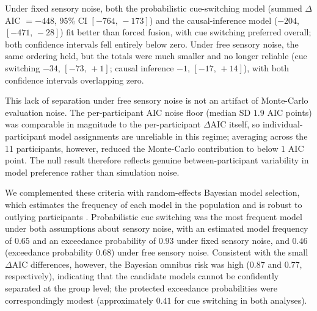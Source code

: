 \documentclass{jov}
\providecommand{\citep}[1]{\cite{#1}}
\begin{document}
Under fixed sensory noise, both the probabilistic cue-switching model (summed $\Delta$AIC $= -448$, 95\% CI $[-764,\,-173]$) and the causal-inference model ($-204$, $[-471,\,-28]$) fit better than forced fusion, with cue switching preferred overall; both confidence intervals fell entirely below zero. Under free sensory noise, the same ordering held, but the totals were much smaller and no longer reliable (cue switching $-34$, $[-73,\,+1]$; causal inference $-1$, $[-17,\,+14]$), with both confidence intervals overlapping zero.

This lack of separation under free sensory noise is not an artifact of Monte-Carlo evaluation noise. The per-participant AIC noise floor (median SD $1.9$ AIC points) was comparable in magnitude to the per-participant $\Delta$AIC itself, so individual-participant model assignments are unreliable in this regime; averaging across the 11 participants, however, reduced the Monte-Carlo contribution to below $1$ AIC point. The null result therefore reflects genuine between-participant variability in model preference rather than simulation noise.



We complemented these criteria with random-effects Bayesian model selection, which estimates the frequency of each model in the population and is robust to outlying participants \citep{stephan2009bayesian,rigoux2014bayesian}. Probabilistic cue switching was the most frequent model under both assumptions about sensory noise, with an estimated model frequency of $0.65$ and an exceedance probability of $0.93$ under fixed sensory noise, and $0.46$ (exceedance probability $0.68$) under free sensory noise. Consistent with the small $\Delta$AIC differences, however, the Bayesian omnibus risk was high ($0.87$ and $0.77$, respectively), indicating that the candidate models cannot be confidently separated at the group level; the protected exceedance probabilities were correspondingly modest (approximately $0.41$ for cue switching in both analyses).
\end{document}
